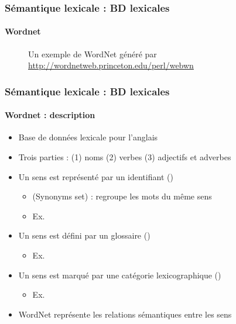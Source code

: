 \documentclass[xcolor=table]{beamer}
\begin{document}
\begin{frame}
\frametitle{Sémantique lexicale : BD lexicales}
\framesubtitle{Wordnet}

\begin{minipage}{.3\textwidth}
	\begin{figure}
		\caption{Un exemple de WordNet généré par \url{http://wordnetweb.princeton.edu/perl/webwn}}
	\end{figure}
\end{minipage}
\begin{minipage}{.68\textwidth}
\end{minipage}
	
\end{frame}

\begin{frame}
\frametitle{Sémantique lexicale : BD lexicales}
\framesubtitle{Wordnet : description}
	
\begin{itemize}
	\item Base de données lexicale pour l'anglais \cite{1995-miller}
	\item Trois parties : (1) noms (2) verbes (3) adjectifs et adverbes
	\item Un sens est représenté par un identifiant ()
	\begin{itemize}
		\item {} (Synonyms set) : regroupe les mots du même sens 
		\item Ex. 
	\end{itemize}
	\item Un sens est défini par un glossaire ()
	\begin{itemize}
		\item Ex. 
	\end{itemize}
	\item Un sens est marqué par une catégorie lexicographique ()
	\begin{itemize}
		\item Ex. 
	\end{itemize}
	\item WordNet représente les relations sémantiques entre les sens
\end{itemize}
	
\end{frame}
\end{document}
